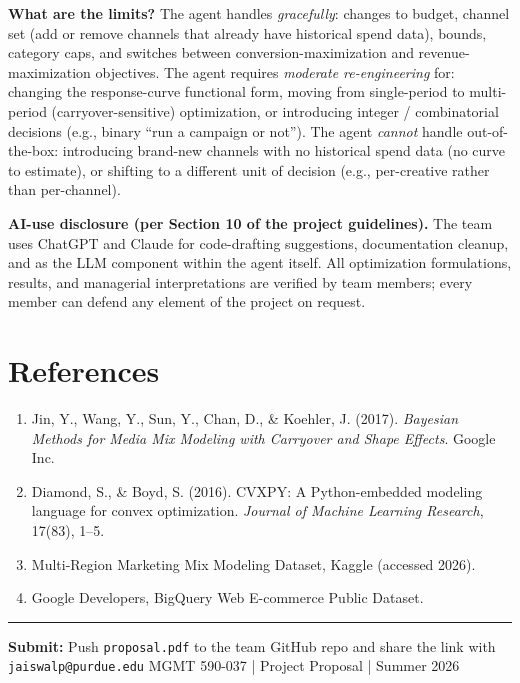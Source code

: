 \documentclass[11pt]{article}
\begin{document}
\textbf{What are the limits?} The agent handles \emph{gracefully}: changes to budget, channel set (add or remove channels that already have historical spend data), bounds, category caps, and switches between conversion-maximization and revenue-maximization objectives. The agent requires \emph{moderate re-engineering} for: changing the response-curve functional form, moving from single-period to multi-period (carryover-sensitive) optimization, or introducing integer / combinatorial decisions (e.g., binary ``run a campaign or not''). The agent \emph{cannot} handle out-of-the-box: introducing brand-new channels with no historical spend data (no curve to estimate), or shifting to a different unit of decision (e.g., per-creative rather than per-channel).

\vspace{4pt}
\textbf{AI-use disclosure (per Section 10 of the project guidelines).} The team uses ChatGPT and Claude for code-drafting suggestions, documentation cleanup, and as the LLM component within the agent itself. All optimization formulations, results, and managerial interpretations are verified by team members; every member can defend any element of the project on request.

\section*{References}

\begin{enumerate}[leftmargin=2em, itemsep=1pt]
  \item Jin, Y., Wang, Y., Sun, Y., Chan, D., \& Koehler, J. (2017). \textit{Bayesian Methods for Media Mix Modeling with Carryover and Shape Effects}. Google Inc.
  \item Diamond, S., \& Boyd, S. (2016). CVXPY: A Python-embedded modeling language for convex optimization. \textit{Journal of Machine Learning Research}, 17(83), 1--5.
  \item Multi-Region Marketing Mix Modeling Dataset, Kaggle (accessed 2026).
  \item Google Developers, BigQuery Web E-commerce Public Dataset.
\end{enumerate}

\vfill\hrule\vspace{4pt}
{\small\color{navyblue}
\textbf{Submit:} Push \texttt{proposal.pdf} to the team GitHub repo and share the link with \texttt{jaiswalp@purdue.edu}
\hfill
MGMT 590-037 \;|\; Project Proposal \;|\; Summer 2026}
\end{document}
